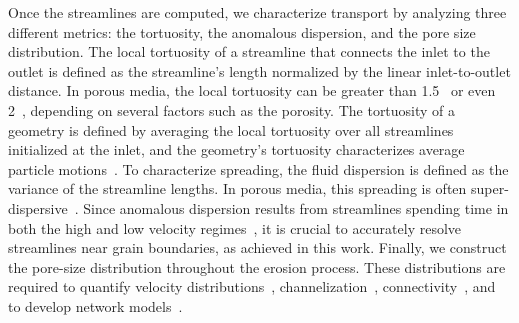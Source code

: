 \documentclass{jfm}
\begin{document}
Once the streamlines are computed, we characterize transport by
analyzing three different metrics: the tortuosity, the anomalous
dispersion, and the pore size distribution.  The local tortuosity of a
streamline that connects the inlet to the outlet is defined as the
streamline's length normalized by the linear inlet-to-outlet distance.
In porous media, the local tortuosity can be greater than
1.5~\citep{kop-kat-tim1996, mat-kha-koz2008} or even
2~\citep{dud-koz-mat2011}, depending on several factors such as the
porosity. The tortuosity of a geometry is defined by averaging the local
tortuosity over all streamlines initialized at the inlet, and the
geometry's tortuosity characterizes average particle
motions~\citep{hak-com-den2019}.  To characterize spreading, the fluid
dispersion is defined as the variance of the streamline lengths. In
porous media, this spreading is often
super-dispersive~\citep{kan-dea-nun-bij-blu-jua2014, cus-hu-den1995,
dea-leb-den-tar-bol-dav2013}. Since anomalous dispersion results from
streamlines spending time in both the high and low velocity
regimes~\citep{ber-sch2001}, it is crucial to accurately resolve
streamlines near grain boundaries, as achieved in this work.  Finally,
we construct the pore-size distribution throughout the erosion process.
These distributions are required to quantify velocity
distributions~\citep{ali-par-wei-bre2017, dea-qua-bir-jua2018},
channelization~\citep{sie-ili-pri-riv-gua2019},
connectivity~\citep{knu-car2005, wes-blo-gra2001}, and to develop
network models~\citep{bry-kin-mel1993, bry-mel-cad1993, bij-blu2006}. 

%
\end{document}
